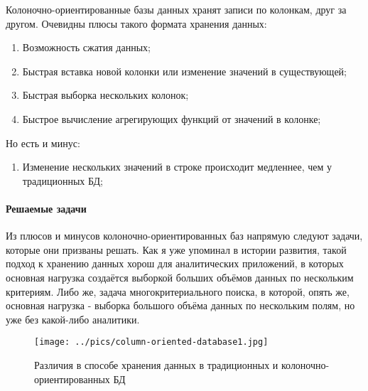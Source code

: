 \documentclass{matmex-diploma}
\begin{document}
        Колоночно-ориентированные базы данных хранят записи по колонкам, друг за другом.  Очевидны плюсы такого формата хранения данных:
        \begin{enumerate}
            \item Возможность сжатия данных;
            \item Быстрая вставка новой колонки или изменение значений в существующей;
            \item Быстрая выборка нескольких колонок;
            \item Быстрое вычисление агрегирующих функций от значений в колонке;
        \end{enumerate}
        Но есть и минус:
        \begin{enumerate}
            \item Изменение нескольких значений в строке происходит медленнее, чем у традиционных БД;
        \end{enumerate}
    \paragraph{Решаемые задачи} 
        Из плюсов и минусов колоночно-ориентированных баз напрямую следуют задачи, которые они призваны решать. Как я уже упоминал в истории развития, такой подход к хранению данных хорош для аналитических приложений, в которых основная нагрузка создаётся выборкой больших объёмов данных по нескольким критериям. Либо же, задача многокритериального поиска, в которой, опять же, основная нагрузка - выборка большого объёма данных по нескольким полям, но уже без какой-либо аналитики.
        \begin{figure}[h]
            \centering
            \texttt{[image: ../pics/column-oriented-database1.jpg]}
            \caption{Различия в способе хранения данных в традиционных и колоночно-ориентированных БД}
            \label{architecture_diff}
        \end{figure}
\end{document}
